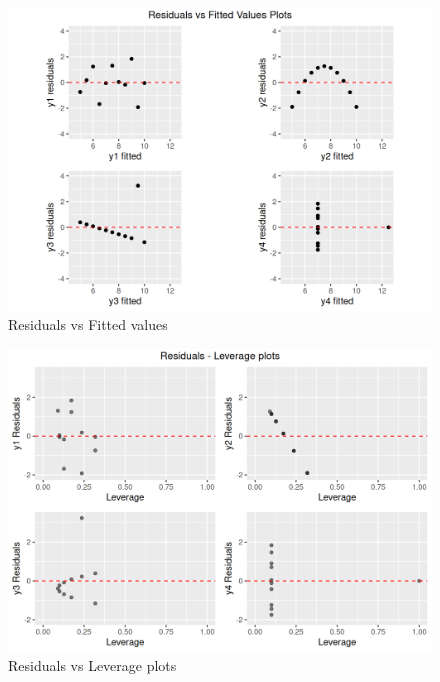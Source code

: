 \documentclass[12pt]{article}
\begin{document}
\begin{figure}[htbp]
\includegraphics[width=.7\textwidth]{RVF.png}
\centering
\caption{Residuals vs Fitted values}
\label{Fig:RVF}
\end{figure}

\begin{figure}[htbp]
\includegraphics[width=.7\textwidth]{RVL.png}
\centering
\caption{Residuals vs Leverage plots}
\label{Fig:RVL}
\end{figure}
	

	
\end{document}
